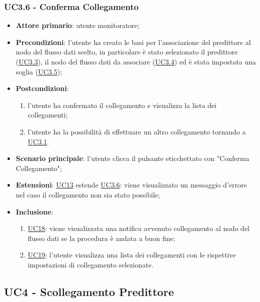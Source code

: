 	\subsubsection{UC3.6 - Conferma Collegamento}
		\begin{itemize}
			\item\textbf{Attore primario}: utente monitoratore;
			\item\textbf{Precondizioni}: l’utente ha creato le basi per l'associazione del predittore al nodo del flusso dati scelto, in particolare è stato selezionato il predittore (\hyperref[par:UC3.3]{UC3.3}), il nodo del flusso dati da associare (\hyperref[par:UC3.4]{UC3.4}) ed è stata impostata una soglia (\hyperref[par:UC3.5]{UC3.5});
			\item\textbf{Postcondizioni}: 
				\begin{enumerate}
					\item l’utente ha confermato il collegamento e visualizza la lista dei collegamenti;
					\item l'utente ha la possibilità di effettuare un altro collegamento tornando a \hyperref[par:UC3.1]{UC3.1}.
				\end{enumerate}
			\item\textbf{Scenario principale}: l’utente clicca il pulsante eticchettato con "Conferma Collegamento";
			\item\textbf{Estensioni}: \hyperref[par:UC13]{UC13} estende \hyperref[par:UC3.6]{UC3.6}: viene visualizzato un messaggio d’errore nel caso il collegamento non sia stato possibile;
			\item\textbf{Inclusione}: 
				\begin{enumerate}
					\item\hyperref[par:UC18]{UC18}: viene visualizzata una notifica avvenuto collegamento al nodo del flusso dati se la procedura è andata a buon fine;
					\item\hyperref[par:UC19]{UC19}: l'utente visualizza una lista dei collegamenti con le rispettive impostazioni di collegamento selezionate.
				\end{enumerate}
		\end{itemize}

	

	\label{par:UC4}
	\subsection{UC4 - Scollegamento Predittore}

